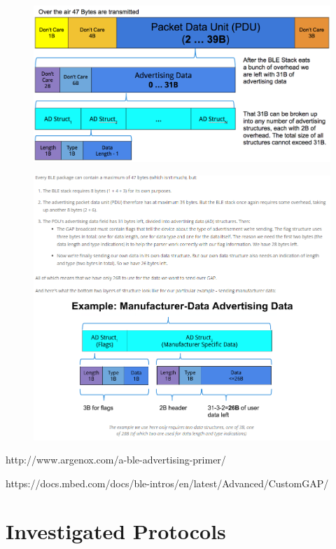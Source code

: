       \FloatBarrier
      \begin{figure}[h]
        \includegraphics[width=\textwidth]{Images/general_structure.png}
      \end{figure}
      \FloatBarrier

      \FloatBarrier
      \begin{figure}[h]
        \includegraphics[width=\textwidth]{Images/packet_example.png}
      \end{figure}
      \FloatBarrier
      http://www.argenox.com/a-ble-advertising-primer/

      https://docs.mbed.com/docs/ble-intros/en/latest/Advanced/CustomGAP/

    \section{Investigated Protocols}
